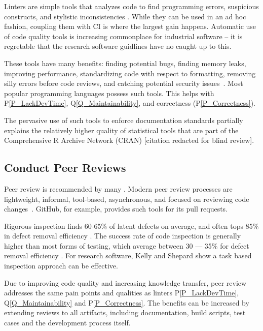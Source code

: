 \documentclass[doubleblind,12pt, 3p, times]{elsarticle}
\newcommand{\ppref}[1]{P\ref{#1}}
\newcommand{\qref}[1]{Q\ref{#1}}
\begin{document}
Linters are simple tools that analyzes code to find programming errors,
suspicious constructs, and stylistic inconsistencies \cite{Wikipedia2022_Lint}.
While they can be used in an ad hoc fashion, coupling them with CI is where
the largest gain happens. Automatic use of code quality tools is increasing
commonplace for industrial software -- it is regretable that the
research software guidlines have no caught up to this.

These tools have many benefits: finding potential bugs, finding memory
leaks, improving performance, standardizing code with respect to formatting,
removing silly errors before code reviews, and catching potential security
issues~\cite{SourceLevel2022_Lint}. Most popular programming languages possess
such tools. This helps with \ppref{P_LackDevTime}, \qref{Q_Maintainability},
and correctness (\ppref{P_Correctness}).

The pervasive use of such tools to enforce documentation standards
partially explains the relatively higher quality of statistical tools that are
part of the Comprehensive R Archive Network (CRAN) [citation redacted for blind
review].  %

\subsection{Conduct Peer Reviews} \label{Sec_PeerReview}

Peer review is recommended by many \cite{HerouxEtAl2008,
OrvizEtAl2017, USGS2019}. Modern peer review processes are lightweight,
informal, tool-based, asynchronous, and focused
on reviewing code changes~\cite{SadowskiEtAl2018}. GitHub, for example,
provides such tools for its pull requests.

Rigorous inspection finds 60-65\% of latent defects on
average, and often tops 85\% in defect removal efficiency \cite{Jones2008}. The
success rate of code inspection is generally higher than most forms of testing,
which average between 30 --- 35\% for defect removal efficiency
\cite{EbertAndJones2009, Jones2008}. For research software, Kelly and Shepard
\cite{KellyAndShepard2000} show a task based inspection approach can be
effective.

Due to improving code quality and increasing knowledge transfer, peer review
addresses the same pain points and qualities as linters \ppref{P_LackDevTime},
\qref{Q_Maintainability} and \ppref{P_Correctness}. The benefits can be
increased by extending reviews to all artifacts, including documentation, build
scripts, test cases and the development process itself.
\end{document}
